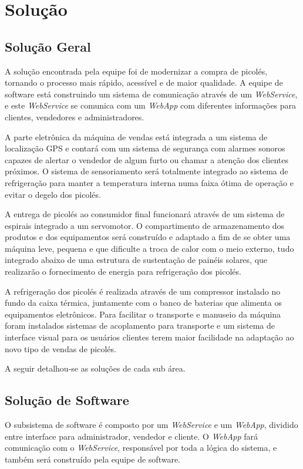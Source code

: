 \chapter{Solução}

\section{Solução Geral}

A solução encontrada pela equipe foi de modernizar a compra de picolés, tornando o processo mais rápido, acessível e de maior qualidade. A equipe de software está construindo um sistema de comunicação através de um \textit{WebService}, e este \textit{WebService} se comunica com um \textit{WebApp} com diferentes informações para clientes, vendedores e administradores.

A parte eletrônica da máquina de vendas está integrada a um sistema de localização GPS e contará com um sistema de segurança com alarmes sonoros capazes de alertar o vendedor de algum furto ou chamar a atenção dos clientes próximos. O sistema de sensoriamento será totalmente integrado ao sistema de refrigeração para manter a temperatura interna numa faixa ótima de operação e evitar o degelo dos picolés.

A entrega de picolés ao consumidor final funcionará através de um sistema de espirais integrado a um servomotor. O compartimento de armazenamento dos produtos e dos equipamentos será construído e adaptado a fim de se obter uma máquina leve, pequena e que dificulte a troca de calor com o meio externo, tudo integrado abaixo de uma estrutura de sustentação de painéis solares, que realizarão o fornecimento de energia para refrigeração dos picolés.

A refrigeração dos picolés é realizada através de um compressor instalado no fundo da caixa térmica,  juntamente com o banco de baterias que alimenta os equipamentos eletrônicos. Para facilitar o transporte e manuseio da máquina foram instalados sistemas de acoplamento para transporte e um sistema de interface visual para os usuários clientes terem maior facilidade na adaptação ao novo tipo de vendas de picolés.

A seguir detalhou-se as soluções de cada sub área.

\section{Solução de Software}

O subsistema de software é composto por um \textit{WebService} e um \textit{WebApp}, dividido entre interface para administrador, vendedor e cliente. O \textit{WebApp} fará comunicação com o \textit{WebService}, responsável por toda a lógica do sistema, e também será construído pela equipe de software.

